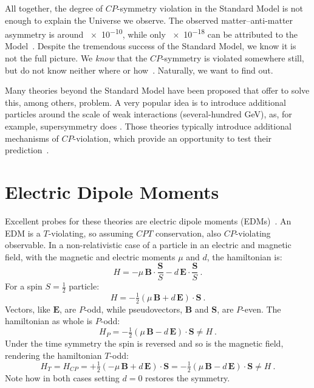 All together, the degree of $CP$-symmetry violation in the Standard Model is not enough to explain the Universe we observe. The observed matter--anti-matter asymmetry is around \num{e-10}, while only \num{e-18} can be attributed to the Model~\cite{Riotto1999}. Despite the tremendous success of the Standard Model, we know it is not the full picture. We \emph{know} that the $CP$-symmetry is violated somewhere still, but do not know neither where or how~\cite{Pospelov2005}. Naturally, we want to find out. 

Many theories beyond the Standard Model have been proposed that offer to solve this, among others, problem. A very popular idea is to introduce additional particles around the scale of weak interactions (several-hundred GeV), as, for example, supersymmetry does . Those theories typically introduce additional mechanisms of $CP$-violation, which provide an opportunity to test their prediction~\cite{Ellis1989}.



\section{Electric Dipole Moments}

Excellent probes for these theories are electric dipole moments (EDMs)~\cite{Pospelov2005}. An EDM is a $T$-violating, so assuming $CPT$ conservation, also $CP$-violating observable. In a non-relativistic case of a particle in an electric and magnetic field, with the magnetic and electric moments $\mu$ and $d$, the hamiltonian is:
\begin{equation}
  H = - \mu \, \bm{B} \cdot \frac{\bm{S}}{S} - d \, \bm{E} \cdot \frac{\bm{S}}{S} \ .
\end{equation}
For a spin $S = \frac{1}{2}$ particle:
\begin{equation}
  H = - \tfrac{1}{2} \left( \mu \, \bm{B} + d \, \bm{E} \right ) \cdot \bm{S} \ .
\end{equation}
Vectors, like $\bm{E}$, are $P$-odd, while pseudovectors, $\bm{B}$ and $\bm{S}$, are $P$-even. The hamiltonian as whole is $P$-odd:
\begin{equation}
  H_P = - \tfrac{1}{2} \left( \mu \, \bm{B} - d \, \bm{E} \right ) \cdot \bm{S} \neq H \ .
\end{equation}
Under the time symmetry the spin is reversed and so is the magnetic field, rendering the hamiltonian $T$-odd:
\begin{equation}
  H_T = H_{CP} = + \tfrac{1}{2} \left( - \mu \, \bm{B} + d \, \bm{E} \right ) \cdot \bm{S} = - \tfrac{1}{2} \left( \mu \, \bm{B} - d \, \bm{E} \right ) \cdot \bm{S} \neq H \ .
\end{equation}
Note how in both cases setting $d = 0$ restores the symmetry.

